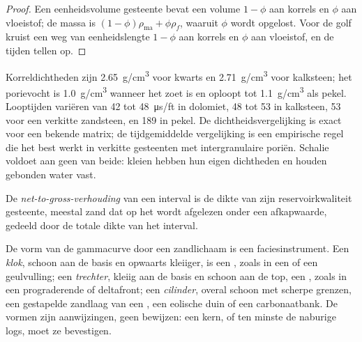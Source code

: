 \begin{proof}
Een eenheidsvolume gesteente bevat een volume $1 - \phi$ aan korrels en $\phi$ aan
vloeistof; de massa is $(1 - \phi)\rho_{\mathrm{ma}} + \phi\rho_f$, waaruit
$\phi$ wordt opgelost. Voor de golf kruist een weg van eenheidslengte $1 - \phi$ aan
korrels en $\phi$ aan vloeistof, en de tijden tellen op.
\end{proof}

Korreldichtheden zijn \qty{2.65}{g/cm^3} voor kwarts en \qty{2.71}{g/cm^3} voor
kalksteen; het porievocht is \qty{1.0}{g/cm^3} wanneer het zoet is en oploopt tot
\qty{1.1}{g/cm^3} als pekel. Looptijden variëren van 42 tot
\qty{48}{\micro\second/ft} in dolomiet, 48 tot 53 in kalksteen, 53 voor een
verkitte zandsteen, en 189 in pekel. De dichtheidsvergelijking is exact voor
een bekende matrix; de tijdgemiddelde vergelijking is een empirische regel die
het best werkt in verkitte gesteenten met intergranulaire poriën. Schalie voldoet aan geen van beide:
kleien hebben hun eigen dichtheden en houden gebonden water vast.

\begin{definition}\label{def:b3:facies-models:ntg}
De \emph{net-to-gross-verhouding} van een interval is de
dikte van zijn reservoirkwaliteit gesteente, meestal zand dat op het  wordt
afgelezen onder een afkapwaarde, gedeeld door de totale dikte van het interval.
\end{definition}

De vorm van de gammacurve door een zandlichaam is een faciesinstrument.
Een \emph{klok}, schoon aan de basis en opwaarts kleiiger, is een , zoals in een  of een geulvulling; een \emph{trechter}, kleiig aan
de basis en schoon aan de top, een , zoals in een
prograderende  of deltafront; een \emph{cilinder}, overal schoon met
scherpe grenzen, een gestapelde zandlaag van een , een eolische duin of een
carbonaatbank. De vormen zijn aanwijzingen, geen bewijzen: een kern, of ten minste de
naburige logs, moet ze bevestigen.

